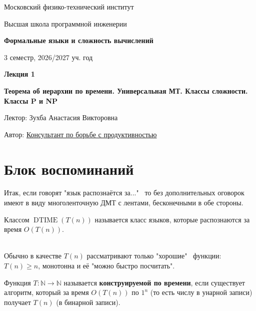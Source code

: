 \documentclass[11pt]{article}
\DeclareMathOperator{\DTIME}{DTIME}
\newcommand{\lectureNumber}{1}
\newcommand{\lectureTitle}{Теорема об иерархии по времени. Универсальная МТ. Классы сложности. Классы P и NP}
\newcommand{\courseName}{Формальные языки и сложность вычислений}
\newcommand{\semester}{3 семестр, 2026/2027 уч. год}
\begin{document}
\begin{titlepage}
    \centering
    
    {\large Московский физико-технический институт \par}
    {\large Высшая школа программной инженерии \par}
    \vspace{2cm}

    {\Large \textbf{\courseName} \par}
    {\large \semester \par}
    
    \vspace*{\fill}

    {\Huge \textbf{Лекция \lectureNumber} \par}
    {\Huge \textbf{\lectureTitle} \par}
    
    \vspace*{\fill}
    
    {\large Лектор: Зухба Анастасия Викторовна \par}
    {\large Автор: \href{https://t.me/ceagest}{Консультант по борьбе с продуктивностью} \par}

\end{titlepage}


\section{Блок воспоминаний}

Итак, если говорят "язык распознаётся за..." \, то без дополнительных оговорок имеют в виду многоленточную ДМТ с лентами, бесконечными в обе стороны.

\begin{definition}
    Классом $\DTIME(T(n))$ называется класс языков, которые распознаются за время $O(T(n))$.
\end{definition} \leavevmode
\\
Обычно в качестве $T(n)$ рассматривают только "хорошие" \, функции: $T(n) \geq n$, монотонна и её "можно быстро посчитать".

\begin{definition}
    Функция $T \colon \mathbb{N} \to \mathbb{N}$ называется \textbf{конструируемой по времени}, если существует алгоритм, который за время $O(T(n))$ по $1^n$ (то есть числу в унарной записи) получает $T(n)$ (в бинарной записи).
\end{definition}
\end{document}
